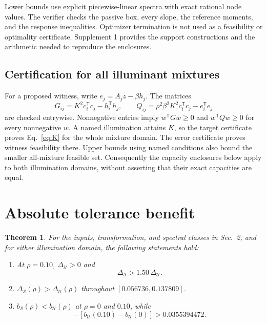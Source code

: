 \documentclass{optica-article}
\newtheorem{theorem}{Theorem}
\begin{document}
Lower bounds use explicit piecewise-linear spectra with exact rational node values. The verifier checks the passive box, every slope, the reference moments, and the response inequalities. Optimizer termination is not used as a feasibility or optimality certificate. Supplement 1 provides the support constructions and the arithmetic needed to reproduce the enclosures.

\subsection{Certification for all illuminant mixtures}
For a proposed witness, write $e_j=A_jz-\beta h_j$. The matrices
\begin{equation}
 G_{ij}=K^2c_i^{\mathsf T}c_j-h_i^{\mathsf T}h_j,
 \qquad
 Q_{ij}=\rho^2\beta^2K^2c_i^{\mathsf T}c_j-e_i^{\mathsf T}e_j
 \label{eq:grams}
\end{equation}
are checked entrywise. Nonnegative entries imply $w^{\mathsf T}Gw\geq0$ and $w^{\mathsf T}Qw\geq0$ for every nonnegative $w$. A named illumination attains $K$, so the target certificate proves Eq.~\eqref{eq:K} for the whole mixture domain. The error certificate proves witness feasibility there. Upper bounds using named conditions also bound the smaller all-mixture feasible set. Consequently the capacity enclosures below apply to both illumination domains, without asserting that their exact capacities are equal.

\section{Absolute tolerance benefit}
\begin{theorem}\label{thm:main}
For the inputs, transformation, and spectral classes in Sec.~2, and for either illumination domain, the following statements hold:
\begin{enumerate}
\item At $\rho=0.10$, $\Delta_{\mathcal U}>0$ and
\begin{equation}
 \Delta_{\mathcal S}>1.50\,\Delta_{\mathcal U}.
 \label{eq:mainresult}
\end{equation}
\item $\Delta_{\mathcal S}(\rho)>\Delta_{\mathcal U}(\rho)$ throughout $[0.056736,0.137809]$.
\item $b_{\mathcal S}(\rho)<b_{\mathcal U}(\rho)$ at $\rho=0$ and $0.10$, while
\begin{equation}
 [b_{\mathcal S}(0.10)-b_{\mathcal S}(0)]-
 [b_{\mathcal U}(0.10)-b_{\mathcal U}(0)]>0.0355394472.
 \label{eq:rawgain}
\end{equation}
\end{enumerate}
\end{theorem}
\end{document}
